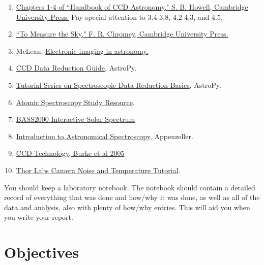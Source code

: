 \documentclass{../lab}
\begin{document}
\begin{enumerate}
    \item \href{https://drive.google.com/drive/folders/1-1AobgZIU3wm8dJnMgqiHQFDR6FosZeF?usp=drive_link}{Chapters 1-4 of ``Handbook of CCD Astronomy," S. B. Howell, Cambridge University Press.} Pay special attention to 3.4-3.8, 4.2-4.3, and 4.5.
    \item \href{https://search.library.berkeley.edu/permalink/01UCS_BER/1thfj9n/alma991076736979706532}{``To Measure the Sky," F. R. Chromey, Cambridge University Press.}
    \item McLean, \href{https://drive.google.com/drive/folders/1-1AobgZIU3wm8dJnMgqiHQFDR6FosZeF?usp=drive_link}{Electronic imaging in astronomy.}
    \item \href{https://www.astropy.org/ccd-reduction-and-photometry-guide/v/dev/notebooks/00-00-Preface.html}{CCD Data Reduction Guide}, AstroPy.
    \item \href{https://learn.astropy.org/tutorials/index-spectroscopy.html}{Tutorial Series on Spectroscopic Data Reduction Basics}, AstroPy.
    \item \href{https://arinainphysics.com/educational-resources/atomic-spectroscopy/}{Atomic Spectroscopy Study Resource}.
    \item \href{https://bass2000.obspm.fr/solar_spect.php}{BASS2000 Interactive Solar Spectrum}
    \item \href{https://search.library.berkeley.edu/permalink/01UCS_BER/1thfj9n/alma991002414119706532}{Introduction to Astronomical Spectroscopy}, Appenzeller.
    \item 
    \href{https://www.astrosen.unam.mx/~richer/docencia/tecnicas/articulos/inst_ccd_technology_burkeetal05.pdf}{CCD Technology, Burke et al 2005}
    \item \href{https://www.thorlabs.com/camera-noise-and-temperature-tutorial?tabName=Camera%2520Noise}{Thor Labs Camera Noise and Temperature Tutorial}.
\end{enumerate}


You should keep a laboratory notebook. The notebook should contain a detailed record of everything that was done and how/why it was done, as well as all of the data and analysis, also with plenty of how/why entries. This will aid you when you write your report.

\section{Objectives}
\end{document}
